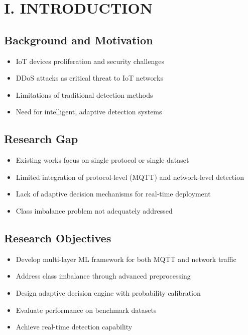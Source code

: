 \documentclass[conference]{IEEEtran}
\begin{document}
\section{I. INTRODUCTION}

\subsection{Background and Motivation}
\begin{itemize}
    \item IoT devices proliferation and security challenges
    \item DDoS attacks as critical threat to IoT networks
    \item Limitations of traditional detection methods
    \item Need for intelligent, adaptive detection systems
\end{itemize}

\subsection{Research Gap}
\begin{itemize}
    \item Existing works focus on single protocol or single dataset
    \item Limited integration of protocol-level (MQTT) and network-level detection
    \item Lack of adaptive decision mechanisms for real-time deployment
    \item Class imbalance problem not adequately addressed
\end{itemize}

\subsection{Research Objectives}
\begin{itemize}
    \item Develop multi-layer ML framework for both MQTT and network traffic
    \item Address class imbalance through advanced preprocessing
    \item Design adaptive decision engine with probability calibration
    \item Evaluate performance on benchmark datasets
    \item Achieve real-time detection capability
\end{itemize}
\end{document}

